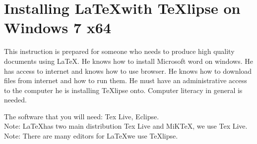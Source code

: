 \documentclass{memoir}
\begin{document}
 
\section*{Installing \LaTeX with TeXlipse on Windows 7 x64}
This instruction is prepared for someone who needs to produce high quality documents using \LaTeX.
He knows how to install Microsoft word on windows. 
He has access to internet and knows how to use browser. 
He knows how to download files from internet and how to run them.
He must have an administrative access to the computer he is installing TeXlipse onto.
Computer literacy in general is needed. 

The software that you will need: Tex Live, Eclipse. \\
Note: \LaTeX has two main distribution Tex Live and MiKTeX, we use Tex Live.  \\ 
Note: There are many editors for \LaTeX we use TeXlipse.  
\end{document}
